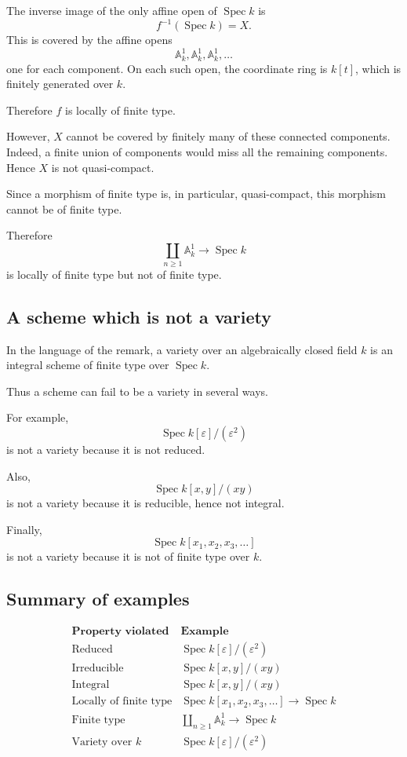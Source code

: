 The inverse image of the only affine open of \(\operatorname{Spec} k\) is
\[
f^{-1}(\operatorname{Spec} k)=X.
\]
This is covered by the affine opens
\[
\mathbb A_k^1,\mathbb A_k^1,\mathbb A_k^1,\dots
\]
one for each component. On each such open, the coordinate ring is \(k[t]\), which is finitely generated over \(k\).

Therefore \(f\) is locally of finite type.

However, \(X\) cannot be covered by finitely many of these connected components. Indeed, a finite union of components would miss all the remaining components. Hence \(X\) is not quasi-compact.

Since a morphism of finite type is, in particular, quasi-compact, this morphism cannot be of finite type.

Therefore
\[
\coprod_{n\geq 1}\mathbb A_k^1
\longrightarrow
\operatorname{Spec} k
\]
is locally of finite type but not of finite type.

\subsection*{A scheme which is not a variety}

In the language of the remark, a variety over an algebraically closed field \(k\) is an integral scheme of finite type over \(\operatorname{Spec} k\).

Thus a scheme can fail to be a variety in several ways.

For example,
\[
\operatorname{Spec} k[\varepsilon]/(\varepsilon^2)
\]
is not a variety because it is not reduced.

Also,
\[
\operatorname{Spec} k[x,y]/(xy)
\]
is not a variety because it is reducible, hence not integral.

Finally,
\[
\operatorname{Spec} k[x_1,x_2,x_3,\dots]
\]
is not a variety because it is not of finite type over \(k\).

\subsection*{Summary of examples}

\[
\begin{array}{c|c}
	\textbf{Property violated} & \textbf{Example} \\
	\hline
	\text{Reduced} &
	\operatorname{Spec} k[\varepsilon]/(\varepsilon^2)
	\\[4pt]
	\text{Irreducible} &
	\operatorname{Spec} k[x,y]/(xy)
	\\[4pt]
	\text{Integral} &
	\operatorname{Spec} k[x,y]/(xy)
	\\[4pt]
	\text{Locally of finite type} &
	\operatorname{Spec} k[x_1,x_2,x_3,\dots]\to \operatorname{Spec} k
	\\[4pt]
	\text{Finite type} &
	\displaystyle \coprod_{n\geq 1}\mathbb A_k^1\to \operatorname{Spec} k
	\\[8pt]
	\text{Variety over }k &
	\operatorname{Spec} k[\varepsilon]/(\varepsilon^2)
\end{array}
\]
